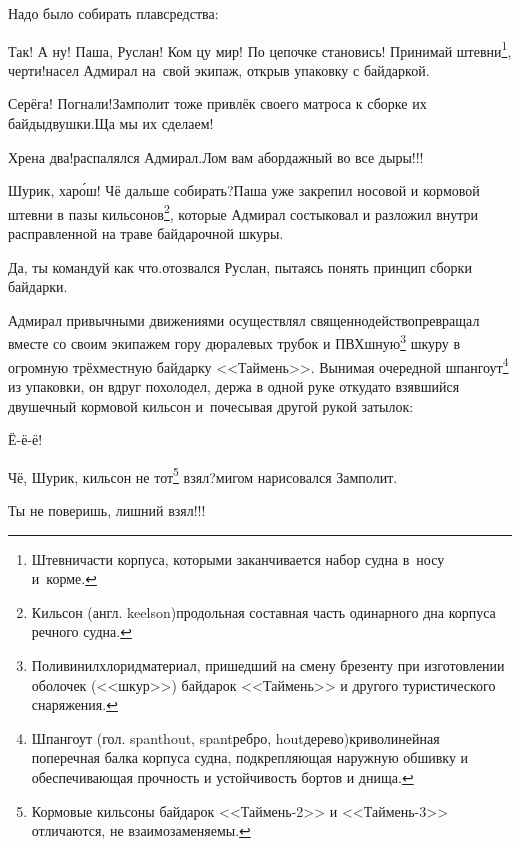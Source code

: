 Надо было собирать плавсредства: 

\renewcommand*{\thefootnote}{\arabic{footnote}}
\setcounter{footnote}{0}
\diagdash Так! А ну! Паша, Руслан! Ком цу мир! По цепочке становись! Принимай штевни\footnote{Штевни\mdash части корпуса, которыми заканчивается набор судна в~носу и~корме.}, черти!\mdash насел Адмирал на~свой экипаж, открыв упаковку с байдаркой.

\diagdash Серёга! Погнали!\mdash Замполит тоже привлёк своего матроса к сборке их байды\sdash двушки.\mdash Ща мы их сделаем!

\diagdash Хрена два!\mdash распалялся Адмирал.\mdash Лом вам абордажный во все дыры!!! 

\diagdash Шурик, хар\'{о}ш! Чё дальше собирать?\mdash Паша уже закрепил носовой и кормовой штевни в пазы кильсонов\footnote{Кильсон (англ. keelson)\mdash продольная составная часть одинарного дна корпуса речного судна\cite{МорскойСправочник}.}, которые Адмирал состыковал и разложил внутри расправленной на траве байдарочной шкуры.

\diagdash Да, ты командуй как что.\mdash отозвался Руслан, пытаясь понять принцип сборки байдарки.

Адмирал привычными движениями осуществлял священнодейство\mdash превращал вместе со своим экипажем гору дюралевых трубок и ПВХ\sdash шную\footnote{Поливинилхлорид\mdash материал, пришедший на смену брезенту при изготовлении оболочек (<<шкур>>) байдарок <<Таймень>> и другого туристического снаряжения.} шкуру в огромную трёхместную байдарку <<Таймень>>. Вынимая очередной шпангоут\footnote{Шпангоут (гол. spanthout, spant\mdash ребро, hout\mdash дерево)\mdash криволинейная поперечная балка корпуса судна, подкрепляющая наружную обшивку и обеспечивающая прочность и устойчивость бортов и днища\cite{МорскойСправочник}.} из упаковки, он вдруг похолодел, держа в одной руке откуда\sdash то взявшийся двушечный кормовой кильсон и~почесывая другой рукой затылок:

\diagdash Ё-ё-ё!

\renewcommand*{\thefootnote}{\arabic{footnote}}
\setcounter{footnote}{0}
\diagdash Чё, Шурик, кильсон не тот\footnote{Кормовые кильсоны байдарок <<Таймень-2>> и <<Таймень-3>> отличаются, не взаимозаменяемы.} взял?\mdash мигом нарисовался Замполит.

\diagdash Ты не поверишь, лишний взял!!!


